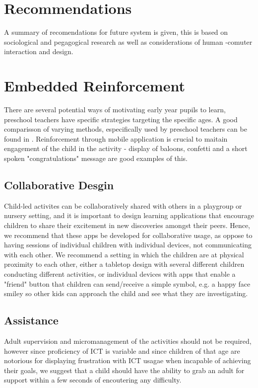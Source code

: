 \documentclass{sig-alternate}
\begin{document}
\section{Recommendations}
A summary of recomendations for future system is given, this is based on sociological and pegagogical research as well as considerations of human -comuter interaction and design. 

\section*{Embedded Reinforcement}
There are several potential ways of motivating early year pupils to learn, preschool teachers have specific strategies targeting the specific ages. A good comparisson of varying methods, especifically used by preschool teachers can be found in \cite{hanley2009influencing}. Reinforcement through mobile application is crucial to maitain engagement of the child in the activity - display of baloons, confetti and a short spoken "congratulations" message are good examples of this.
\subsection*{Collaborative Desgin} 
Child-led activites can be collaboratively shared with others in a playgroup or nursery setting, and it is important to design learning applications that encourage children to share their excitement in new discoveries amongst their peers. Hence, we recommend that these apps be developed for collaborative usage, as oppose to having sessions of individual children with individual devices, not communicating with each other. We recommend a setting in which the children are at physical proximity to each other,  either a tabletop design with several different children conducting different activities, or individual devices with apps that enable a "friend" button that children can send/receive a simple symbol, e.g. a happy face smiley so other kids can approach the child and see what they are investigating. 
\subsection*{Assistance}
Adult supervision and micromanagement of the activities should not be required, however since proficiency of ICT is variable and since children of that age are notorious for displaying frustration with ICT  usagae when incapable of achieving their goals, we suggest that a child should have the ability to grab an adult for support within a few seconds of encoutering any difficulty.
\end{document}
